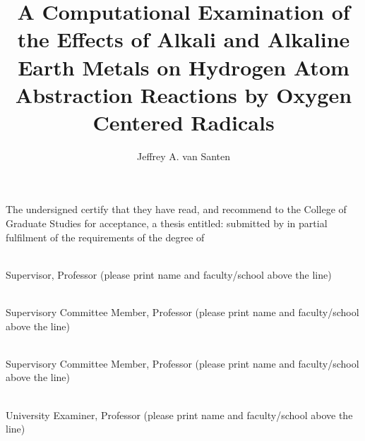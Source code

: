 \documentclass[msc,oneside]{ubcthesis}%
\title{A Computational Examination of the Effects of Alkali and
  Alkaline Earth Metals on Hydrogen Atom Abstraction Reactions by
  Oxygen Centered Radicals}
\author{Jeffrey A. van Santen} %
\begin{document}
\frontmatter                    %

\maketitle                      %

\makeatletter

The undersigned certify that they have read, and recommend to the
College of Graduate Studies for acceptance, a thesis entitled: {\sc
  \@title } submitted by {\sc \@author} in partial fulfilment of the
requirements of the degree of \@degreetitle \makeatother

\newlength{\linespace}
\setlength{\linespace}{.75cm} %
\vspace{\linespace}\smaller

\noindent\underline{\hspace{30em}} \\
Supervisor, Professor (please print name and faculty/school above the line)

\vspace{\linespace}

\noindent\underline{\hspace{30em}} \\
Supervisory Committee Member, Professor (please print name and faculty/school above the line)

\vspace{\linespace}

\noindent\underline{\hspace{30em}} \\
Supervisory Committee Member, Professor (please print name and faculty/school above the line)

\vspace{\linespace}

\noindent\underline{\hspace{30em}} \\
University Examiner, Professor (please print name and faculty/school above the line)
\end{document}
